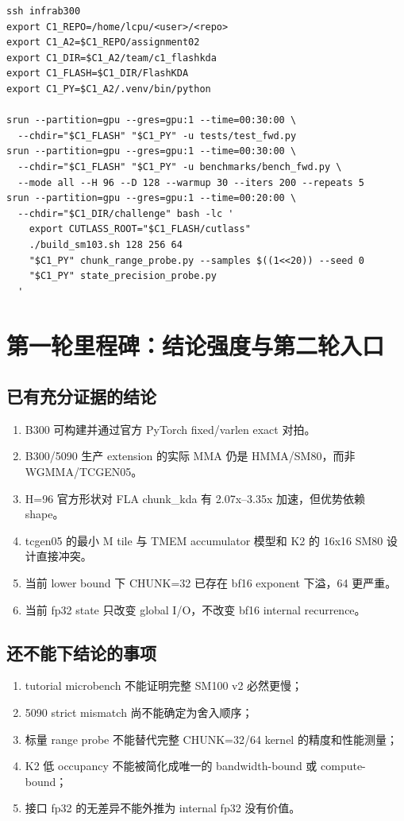 \documentclass[11pt,a4paper,fontset=none]{ctexart}
\begin{document}
\begin{lstlisting}
ssh infrab300
export C1_REPO=/home/lcpu/<user>/<repo>
export C1_A2=$C1_REPO/assignment02
export C1_DIR=$C1_A2/team/c1_flashkda
export C1_FLASH=$C1_DIR/FlashKDA
export C1_PY=$C1_A2/.venv/bin/python

srun --partition=gpu --gres=gpu:1 --time=00:30:00 \
  --chdir="$C1_FLASH" "$C1_PY" -u tests/test_fwd.py
srun --partition=gpu --gres=gpu:1 --time=00:30:00 \
  --chdir="$C1_FLASH" "$C1_PY" -u benchmarks/bench_fwd.py \
  --mode all --H 96 --D 128 --warmup 30 --iters 200 --repeats 5
srun --partition=gpu --gres=gpu:1 --time=00:20:00 \
  --chdir="$C1_DIR/challenge" bash -lc '
    export CUTLASS_ROOT="$C1_FLASH/cutlass"
    ./build_sm103.sh 128 256 64
    "$C1_PY" chunk_range_probe.py --samples $((1<<20)) --seed 0
    "$C1_PY" state_precision_probe.py
  '
\end{lstlisting}

\section{第一轮里程碑：结论强度与第二轮入口}

\subsection{已有充分证据的结论}

\begin{enumerate}
  \item B300 可构建并通过官方 PyTorch fixed/varlen exact 对拍。
  \item B300/5090 生产 extension 的实际 MMA 仍是 HMMA/SM80，而非 WGMMA/TCGEN05。
  \item H=96 官方形状对 FLA chunk\_kda 有 2.07x--3.35x 加速，但优势依赖 shape。
  \item tcgen05 的最小 M tile 与 TMEM accumulator 模型和 K2 的 16x16 SM80
        设计直接冲突。
  \item 当前 lower bound 下 CHUNK=32 已存在 bf16 exponent 下溢，64 更严重。
  \item 当前 fp32 state 只改变 global I/O，不改变 bf16 internal recurrence。
\end{enumerate}

\subsection{还不能下结论的事项}

\begin{enumerate}
  \item tutorial microbench 不能证明完整 SM100 v2 必然更慢；
  \item 5090 strict mismatch 尚不能确定为舍入顺序；
  \item 标量 range probe 不能替代完整 CHUNK=32/64 kernel 的精度和性能测量；
  \item K2 低 occupancy 不能被简化成唯一的 bandwidth-bound 或 compute-bound；
  \item 接口 fp32 的无差异不能外推为 internal fp32 没有价值。
\end{enumerate}
\end{document}
